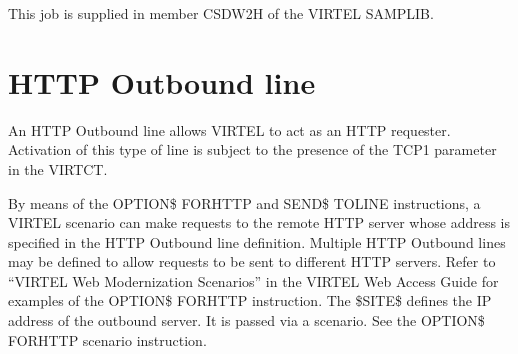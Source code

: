 \documentclass[letterpaper,10pt,english]{sphinxmanual}
\begin{document}
\begin{sphinxVerbatim}[commandchars=\\\{\}]
   
    
   
    
   
    
\end{sphinxVerbatim}

\sphinxAtStartPar
This job is supplied in member CSDW2H of the VIRTEL SAMPLIB.

\ignorespaces 

\section{HTTP Outbound line}
\label{\detokenize{connectivity_guide:http-outbound-line}}\label{\detokenize{connectivity_guide:v462cn-httpoutbound}}\label{\detokenize{connectivity_guide:index-15}}
\sphinxAtStartPar
An HTTP Outbound line allows VIRTEL to act as an HTTP requester. Activation of this type of line is subject to the presence of the TCP1 parameter in the VIRTCT.

\sphinxAtStartPar
By means of the OPTION\$ FOR\sphinxhyphen{}HTTP and SEND\$ TO\sphinxhyphen{}LINE instructions, a VIRTEL scenario can make requests to the remote HTTP server whose address is specified in the HTTP Outbound line definition. Multiple HTTP Outbound lines may be defined to allow requests to be sent to different HTTP servers. Refer to “VIRTEL Web Modernization Scenarios” in the VIRTEL Web Access Guide for examples of the OPTION\$ FOR\sphinxhyphen{}HTTP instruction. The \$SITE\$ defines the IP address of the outbound server. It is passed via a scenario. See the OPTION\$ FOR\sphinxhyphen{}HTTP scenario instruction.
\end{document}
